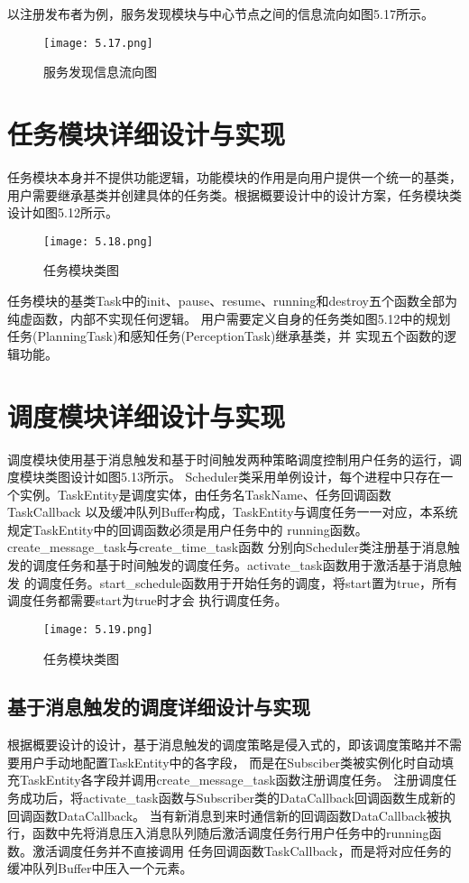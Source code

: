 以注册发布者为例，服务发现模块与中心节点之间的信息流向如图5.17所示。
\begin{figure}[htb]
  \centering
  \texttt{[image: 5.17.png]}
  \caption{服务发现信息流向图}
  \label{fig:11}
\end{figure}

\section{任务模块详细设计与实现}
任务模块本身并不提供功能逻辑，功能模块的作用是向用户提供一个统一的基类，
用户需要继承基类并创建具体的任务类。根据概要设计中的设计方案，任务模块类设计如图5.12所示。
\begin{figure}[H]
  \centering
  \texttt{[image: 5.18.png]}
  \caption{任务模块类图}
  \label{fig:12}
\end{figure}
任务模块的基类Task中的init、pause、resume、running和destroy五个函数全部为纯虚函数，内部不实现任何逻辑。
用户需要定义自身的任务类如图5.12中的规划任务(PlanningTask)和感知任务(PerceptionTask)继承基类，并
实现五个函数的逻辑功能。

\section{调度模块详细设计与实现}
调度模块使用基于消息触发和基于时间触发两种策略调度控制用户任务的运行，调度模块类图设计如图5.13所示。
Scheduler类采用单例设计，每个进程中只存在一个实例。TaskEntity是调度实体，由任务名TaskName、任务回调函数TaskCallback
以及缓冲队列Buffer构成，TaskEntity与调度任务一一对应，本系统规定TaskEntity中的回调函数必须是用户任务中的
running函数。
create\_message\_task与create\_time\_task函数
分别向Scheduler类注册基于消息触发的调度任务和基于时间触发的调度任务。activate\_task函数用于激活基于消息触发
的调度任务。start\_schedule函数用于开始任务的调度，将start置为true，所有调度任务都需要start为true时才会
执行调度任务。
\begin{figure}[H]
  \centering
  \texttt{[image: 5.19.png]}
  \caption{任务模块类图}
  \label{fig:13}
\end{figure}

\subsection{基于消息触发的调度详细设计与实现}
根据概要设计的设计，基于消息触发的调度策略是侵入式的，即该调度策略并不需要用户手动地配置TaskEntity中的各字段，
而是在Subsciber类被实例化时自动填充TaskEntity各字段并调用create\_message\_task函数注册调度任务。
注册调度任务成功后，将activate\_task函数与Subscriber类的DataCallback回调函数生成新的回调函数DataCallback。
当有新消息到来时通信新的回调函数DataCallback被执行，函数中先将消息压入消息队列随后激活调度任务行用户任务中的running函数。激活调度任务并不直接调用
任务回调函数TaskCallback，而是将对应任务的缓冲队列Buffer中压入一个元素。

